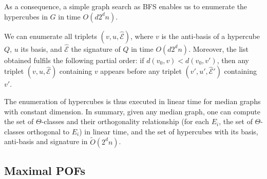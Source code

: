 \documentclass[a4paper,UKenglish,numberwithinsect,cleveref, autoref]{lipics-v2021}
\begin{document}
As a consequence, a simple graph search as BFS enables us to enumerate the hypercubes in $G$ in time $O(d2^dn)$.

\begin{lemma}
We can enumerate all triplets $(v,u,\widehat{\mathcal{E}})$, where $v$ is the anti-basis of a hypercube $Q$, $u$ its basis, and $\widehat{\mathcal{E}}$ the signature of $Q$ in time $O(d2^dn)$. Moreover, the list obtained fulfils the following partial order: if $d(v_0,v) < d(v_0,v')$, then any triplet $(v,u,\widehat{\mathcal{E}})$ containing $v$ appears before any triplet $(v',u',\widehat{\mathcal{E}}')$ containing $v'$.
\label{le:enum_hypercubes}
\end{lemma}

The enumeration of hypercubes is thus executed in linear time for median graphs with constant dimension. In summary, given any median graph, one can compute the set of $\Theta$-classes and their orthogonality relationship (for each $E_i$, the set of $\Theta$-classes orthogonal to $E_i$) in linear time, and the set of hypercubes with its basis, anti-basis and signature in $\tilde{O}(2^dn)$.

\subsection{Maximal POFs} \label{asubsec:max_pofs}
\end{document}

